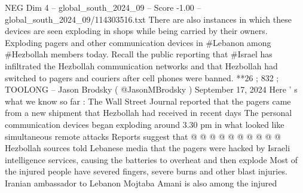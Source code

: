\begin{textsample}{NEG Dim 4 – global\_south\_2024\_09 – Score -1.00 – global\_south\_2024\_09/114303516.txt}
There are also instances in which these devices are seen exploding in shops while being carried by their owners.
Exploding pagers and other communication devices in \#Lebanon among \#Hezbollah members today.
Recall the public reporting that \#Israel has infiltrated the Hezbollah communication networks and that Hezbollah had switched to pagers and couriers after cell phones were banned. **26 ; 832 ; TOOLONG -- Jason Brodsky ( @JasonMBrodsky ) September 17, 2024 Here ' s what we know so far : The Wall Street Journal reported that the pagers came from a new shipment that Hezbollah had received in recent days The personal communication devices began exploding around 3.30 pm in what looked like simultaneous remote attacks Reports suggest that @ @ @ @ @ @ @ @ @ @ Hezbollah sources told Lebanese media that the pagers were hacked by Israeli intelligence services, causing the batteries to overheat and then explode Most of the injured people have severed fingers, severe burns and other blast injuries.
Iranian ambassador to Lebanon Mojtaba Amani is also among the injured

\end{textsample}

